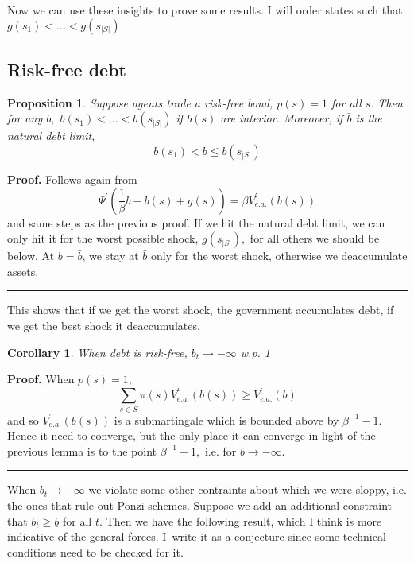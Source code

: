 \documentclass{article}
\newtheorem{corollary}[theorem]{Corollary}
\newtheorem{proposition}[theorem]{Proposition}
\newenvironment{proof}[1][Proof]{\noindent\textbf{#1.} }{\ \rule{0.5em}{0.5em}}
\begin{document}
Now we can use these insights to prove some results. I will order states
such that $g\left( s_{1}\right) <...<g\left( s_{|S|}\right) .$

\subsection{\protect\smallskip Risk-free debt}

\begin{proposition}
Suppose agents trade a risk-free bond, $p\left( s\right) =1$ for all $s.$
Then for any $b,$ $b\left( s_{1}\right) <...<b\left( s_{|S|}\right) $ if $%
b\left( s\right) $ are interior. Moreover, if $\bar{b}$ is the natural debt
limit,%
\[
b\left( s_{1}\right) <b\leq b\left( s_{|S|}\right) 
\]
\end{proposition}

\begin{proof}
Follows again from 
\[
\Psi ^{\prime }\left( \frac{1}{\beta }b-b\left( s\right) +g\left( s\right)
\right) =\beta V_{e.a.}^{\prime }\left( b\left( s\right) \right) 
\]%
and same steps as the previous proof. If we hit the natural debt limit, we
can only hit it for the worst possible shock, $g\left( s_{|S|}\right) ,$ for
all others we should be below. At $b=\bar{b}$, we stay at $\bar{b}$ only for
the worst shock, otherwise we deaccumulate assets.
\end{proof}

\smallskip This shows that if we get the worst shock, the government
accumulates debt, if we get the best shock it deaccumulates.

\begin{corollary}
When debt is risk-free, $b_{t}\rightarrow -\infty $ w.p. 1
\end{corollary}

\begin{proof}
When $p\left( s\right) =1,$ 
\[
\sum_{s\in S}\pi \left( s\right) V_{e.a.}^{\prime }\left( b\left( s\right)
\right) \geq V_{e.a.}^{\prime }\left( b\right) 
\]%
and so $V_{e.a.}^{\prime }\left( b\left( s\right) \right) $ is a
submartingale which is bounded above by $\beta ^{-1}-1.$ Hence it need to
converge, but the only place it can converge in light of the previous lemma
is to the point $\beta ^{-1}-1,$ i.e. for $b\rightarrow -\infty .$
\end{proof}

When $b_{t}\rightarrow -\infty $ we violate some other contraints about
which we were sloppy, i.e. the ones that rule out Ponzi schemes. Suppose we
add an additional constraint that $b_{t}\geq \underline{b}$ for all $t.$
Then we have the following result, which I think is more indicative of the
general forces. I\ write it as a conjecture since some technical conditions
need to be checked for it.
\end{document}

